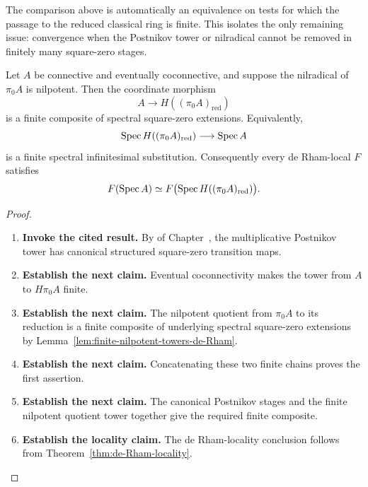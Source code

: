 The comparison above is automatically an equivalence on tests for which the
passage to the reduced classical ring is finite. This isolates the only
remaining issue: convergence when the Postnikov tower or nilradical cannot be
removed in finitely many square-zero stages.

\begin{proposition}
\label{prop:finite-collapse}
Let \(A\) be connective and eventually coconnective, and suppose the nilradical of
\(\pi_0A\) is nilpotent. Then the coordinate morphism
\[
  A\longrightarrow H((\pi_0A)_{\mathrm{red}})
\]
is a finite composite of spectral square-zero extensions. Equivalently,
\[
  \operatorname{Spec} H((\pi_0A)_{\mathrm{red}})
  \longrightarrow
  \operatorname{Spec} A
\]
is a finite spectral infinitesimal substitution. Consequently every de Rham-local
\(F\) satisfies
\[
  F(\operatorname{Spec} A)
  \simeq
  F\bigl(\operatorname{Spec} H((\pi_0A)_{\mathrm{red}})\bigr).
\]
\end{proposition}

\begin{proof}
\leavevmode
\begin{enumerate}[label=\textup{(\arabic*)}]
    \item \textbf{Invoke the cited result.}
    By  of
    Chapter~, the multiplicative
    Postnikov tower has canonical structured square-zero transition maps.
    \item \textbf{Establish the next claim.}
    Eventual
    coconnectivity makes the tower from \(A\) to \(H\pi_0A\) finite.
    \item \textbf{Establish the next claim.}
    The nilpotent
    quotient from \(\pi_0A\) to its reduction is a finite composite of underlying
    spectral square-zero extensions by
    Lemma~\ref{lem:finite-nilpotent-towers-de-Rham}.
    \item \textbf{Establish the next claim.}
    Concatenating these two finite
    chains proves the first assertion.
    \item \textbf{Establish the next claim.}
    The canonical Postnikov stages and the finite nilpotent quotient tower together
    give the required finite composite.
    \item \textbf{Establish the locality claim.}
    The de Rham-locality conclusion follows from
    Theorem~\ref{thm:de-Rham-locality}.
\end{enumerate}
\end{proof}

